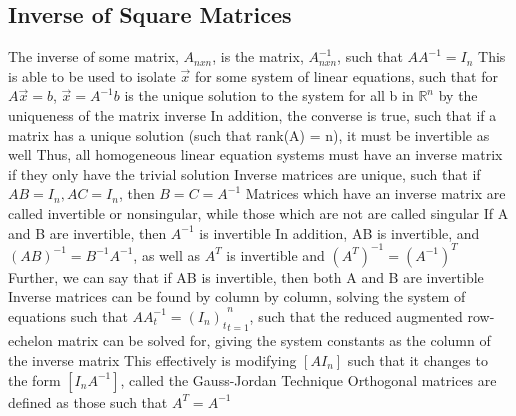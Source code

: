 \documentclass[11 pt, twoside]{article}
\newenvironment{outline*}
{
	\begin{outline}[enumerate]
	}
	{\end{outline}
}
\begin{document}
\subsection{Inverse of Square Matrices}
\begin{outline*}
\1 The inverse of some matrix, $A_{nxn}$, is the matrix, $A^{-1}_{nxn}$, such that $AA^{-1} = I_n$
\2 This is able to be used to isolate $\vec{x}$ for some system of linear equations, such that for $A\vec{x} = b$, $\vec{x} = A^{-1}b$ is the unique solution to the system for all b in $\mathbb{R}^n$ by the uniqueness of the matrix inverse
\3 In addition, the converse is true, such that if a matrix has a unique solution (such that rank(A) = n), it must be invertible as well
\3 Thus, all homogeneous linear equation systems must have an inverse matrix if they only have the trivial solution
\2 Inverse matrices are unique, such that if $AB = I_n, AC = I_n$, then $B = C = A^{-1}$
\2 Matrices which have an inverse matrix are called invertible or nonsingular, while those which are not are called singular
\2 If A and B are invertible, then $A^{-1}$ is invertible
\3 In addition, AB is invertible, and $(AB)^{-1} = B^{-1}A^{-1}$, as well as $A^T$ is invertible and $(A^T)^{-1} = (A^{-1})^T$
\3 Further, we can say that if AB is invertible, then both A and B are invertible
\1 Inverse matrices can be found by column by column, solving the system of equations such that ${AA^{-1}_t = (I_n)_t}_{t=1}^n$, such that the reduced augmented row-echelon matrix can be solved for, giving the system constants as the column of the inverse matrix
\2 This effectively is modifying $[A I_n]$ such that it changes to the form $[I_n A^{-1}]$, called the Gauss-Jordan Technique
\1 Orthogonal matrices are defined as those such that $A^T = A^{-1}$
\end{outline*}
\end{document}
